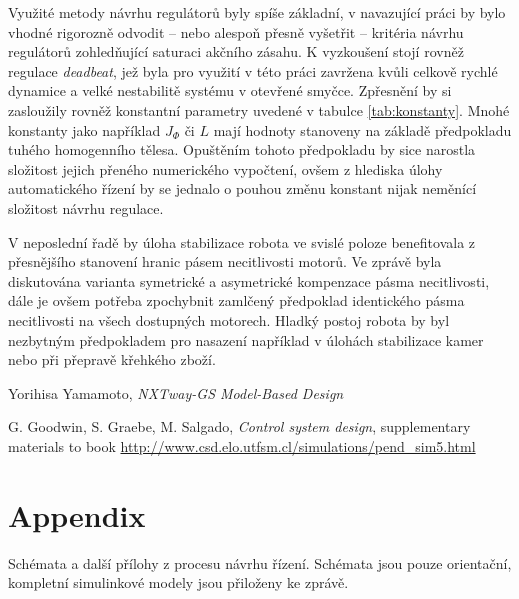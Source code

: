 \documentclass[conference]{IEEEtran}
\begin{document}
Využité metody návrhu regulátorů byly spíše základní, v navazující práci by bylo vhodné rigorozně odvodit -- nebo alespoň
přesně vyšetřit -- kritéria návrhu regulátorů zohledňující saturaci akčního zásahu.
K vyzkoušení stojí rovněž regulace \textit{deadbeat}, jež byla pro využití v této práci zavržena kvůli celkově rychlé dynamice a velké nestabilitě
systému v otevřené smyčce. Zpřesnění by si zasloužily rovněž konstantní parametry uvedené v tabulce \ref{tab:konstanty}.
Mnohé konstanty jako například $J_\varPhi$ či $L$ mají hodnoty stanoveny na základě předpokladu tuhého homogenního tělesa.
Opuštěním tohoto předpokladu by sice narostla složitost jejich přeného numerického vypočtení, ovšem z hlediska úlohy automatického řízení
by se jednalo o pouhou změnu konstant nijak neměnící složitost návrhu regulace.

V neposlední řadě by úloha stabilizace robota ve svislé poloze benefitovala z přesnějšího stanovení hranic pásem necitlivosti
motorů. Ve zprávě byla diskutována varianta symetrické a asymetrické kompenzace pásma necitlivosti, dále je ovšem potřeba zpochybnit
zamlčený předpoklad identického pásma necitlivosti na všech dostupných motorech. Hladký postoj robota by byl nezbytným předpokladem
pro nasazení například v úlohách stabilizace kamer nebo při přepravě křehkého zboží.



\begin{thebibliography}{9}
    
    Yorihisa Yamamoto, \emph{NXTway-GS Model-Based Design} 
    
     G. Goodwin, S. Graebe, M. Salgado, \emph{Control system design}, supplementary materials to book \url{http://www.csd.elo.utfsm.cl/simulations/pend_sim5.html}
    
\end{thebibliography}

\pagebreak
\section{Appendix}

Schémata a další přílohy z procesu návrhu řízení. Schémata jsou pouze orientační, kompletní simulinkové modely jsou přiloženy ke zprávě.
\end{document}
